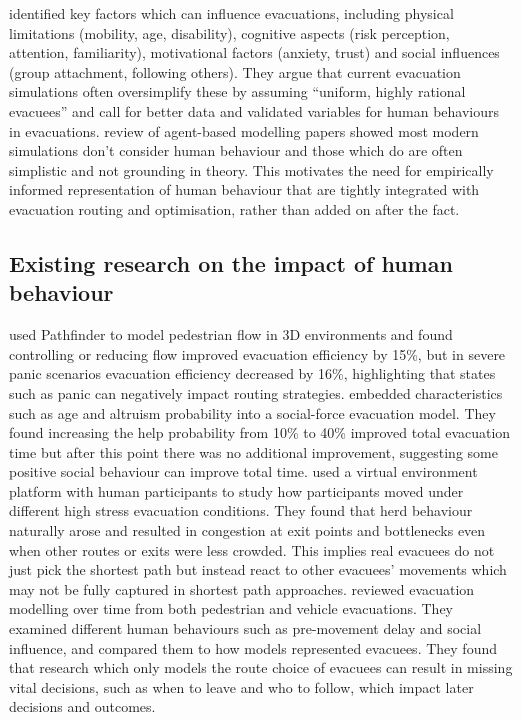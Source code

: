 \documentclass[12pt,a4paper]{report}
\begin{document}
\cite{HOFINGER_2014_FACTORS} identified key factors which can influence evacuations, including physical limitations (mobility, age, disability), cognitive aspects (risk perception, attention, familiarity), motivational factors (anxiety, trust) and social influences (group attachment, following others). They argue that current evacuation simulations often oversimplify these by assuming “uniform, highly rational evacuees” and call for better data and validated variables for human behaviours in evacuations. \cite{TEMPLETON_2024_AGENT_PAPERS} review of agent-based modelling papers showed most modern simulations don't consider human behaviour and those which do are often simplistic and not grounding in theory. This motivates the need for empirically informed representation of human behaviour that are tightly integrated with evacuation routing and optimisation, rather than added on after the fact.

\subsection{Existing research on the impact of human behaviour}
\cite{WANG_2025_PATHFINDER} used Pathfinder to model pedestrian flow in 3D environments and found controlling or reducing flow improved evacuation efficiency by 15\%, but in severe panic scenarios evacuation efficiency decreased by 16\%, highlighting that states such as panic can negatively impact routing strategies. \cite{LI_2024_ALTRUISM} embedded characteristics such as age and altruism probability into a social-force evacuation model. They found increasing the help probability from 10\% to 40\% improved total evacuation time but after this point there was no additional improvement, suggesting some positive social behaviour can improve total time. \cite{MOUSSAID_2016_VIRTUAL_ENV} used a virtual environment platform with human participants to study how participants moved under different high stress evacuation conditions. They found that herd behaviour naturally arose and resulted in congestion at exit points and bottlenecks even when other routes or exits were less crowded. This implies real evacuees do not just pick the shortest path but instead react to other evacuees’ movements which may not be fully captured in shortest path approaches. \cite{KYRIAKIDIS_2021_CONSIDER} reviewed evacuation modelling over time from both pedestrian and vehicle evacuations. They examined different human behaviours such as pre-movement delay and social influence, and compared them to how models represented evacuees. They found that research which only models the route choice of evacuees can result in missing vital decisions, such as when to leave and who to follow, which impact later decisions and outcomes.
\end{document}
